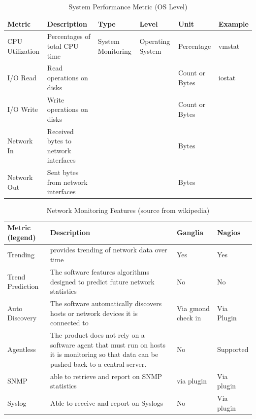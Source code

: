 \documentclass{sig-alternate-05-2015}
\begin{document}
\begin{table}[htb]

\caption{System Performance Metric (OS Level)}
\label{T:SPmetrics}
\bigskip
\begin{tabular}{p{}p{}p{}p{}p{}p{}}
Metric & Description & Type & Level & Unit & Example \\
\hline
CPU Utilization &
Percentages of total CPU time &
System Monitoring &
Operating System & 
Percentage & 
vmstat \\
\hline
I/O Read &
Read operations on disks &
&
&
Count or Bytes &
iostat \\
\hline
I/O Write &
Write operations on disks &
&
&
Count or Bytes  &
\\
\hline
Network In &
Received bytes to network interfaces &
&
&
Bytes &
\\
\hline
Network Out &
Sent bytes from network interfaces &
&
&
Bytes &
\\
\hline
\end{tabular}
\end{table}


\begin{table}[htb]
\caption{Network Monitoring Features (source from wikipedia)}
\label{T:NMmetrics}
\bigskip
\begin{tabular}{p{}p{}p{}p{}}
Metric (legend) & Description & Ganglia & Nagios \\
\hline
Trending &
provides trending of network data over time &
Yes &
Yes \\
\hline
Trend Prediction &
The software features algorithms designed to predict future network statistics &
No &
No \\
\hline
Auto Discovery &
The software automatically discovers hosts or network devices it is connected to &
Via gmond check in &
Via Plugin \\
\hline
Agentless & 
The product does not rely on a software agent that must run on hosts it is monitoring so that data can be pushed back to a central server. &
No &
Supported \\
\hline
SNMP &
able to retrieve and report on SNMP statistics &
via plugin &
Via plugin \\
\hline
Syslog &
Able to receive and report on Syslogs &
No &
Via plugin \\
\hline
\end{tabular}
\end{table}
\end{document}
